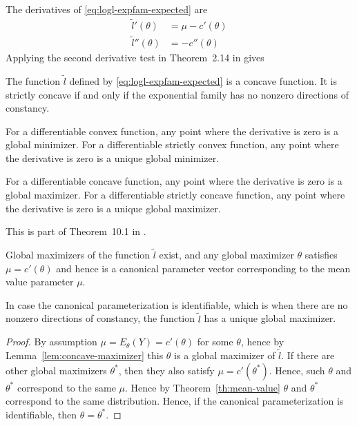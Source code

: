 The derivatives of \eqref{eq:logl-expfam-expected} are
\begin{subequations}
\begin{align}
   \tilde{l}'(\theta) & = \mu - c'(\theta)
   \\
   \tilde{l}''(\theta) & = - c''(\theta)
\end{align}
\end{subequations}
Applying the second derivative test
in Theorem~{2.14} in \citet{rockafellar-wets} gives
\begin{lemma}
The function $\tilde{l}$ defined by \eqref{eq:logl-expfam-expected}
is a concave function.
It is strictly concave if and only if the exponential family has no
nonzero directions of constancy.
\end{lemma}
\begin{lemma} \label{lem:concave-maximizer}
For a differentiable convex function, any point where the derivative
is zero is a global minimizer.
For a differentiable strictly convex function, any point where the derivative
is zero is a unique global minimizer.

For a differentiable concave function, any point where the derivative
is zero is a global maximizer.
For a differentiable strictly concave function, any point where the derivative
is zero is a unique global maximizer.
\end{lemma}
This is part of Theorem~{10.1} in \citet{rockafellar-wets}.

\begin{theorem} \label{th:mean-value-inversion}
Global maximizers of the function $\tilde{l}$ exist, and any global maximizer
$\theta$ satisfies $\mu = c'(\theta)$ and hence is a canonical parameter
vector corresponding to the mean value parameter $\mu$.

In case the canonical parameterization is identifiable, which is when there
are no nonzero directions of constancy, the function $\tilde{l}$ has
a unique global maximizer.
\end{theorem}
\begin{proof}
By assumption $\mu = E_\theta(Y) = c'(\theta)$ for some $\theta$,
hence by Lemma~\ref{lem:concave-maximizer} this $\theta$ is a global maximizer
of $\tilde{l}$.  If there are other global maximizers $\theta^*$,
then they also satisfy $\mu = c'(\theta^*)$.  Hence,
such $\theta$ and $\theta^*$ correspond to the same $\mu$.
Hence by Theorem~\ref{th:mean-value} $\theta$ and $\theta^*$ correspond
to the same distribution.
Hence, if the canonical parameterization is identifiable,
then $\theta = \theta^*$.
\end{proof}

